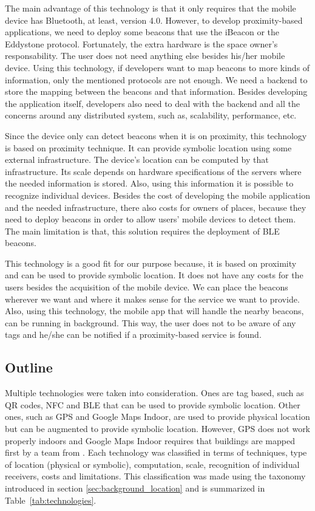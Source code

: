 The main advantage of this technology is that it only requires that the mobile device has Bluetooth, at least, version 4.0.
However, to develop proximity-based applications, we need to deploy some beacons that use the iBeacon or the Eddystone protocol.
Fortunately, the extra hardware is the space owner's responsability.
The user does not need anything else besides his/her mobile device.
Using this technology, if developers want to map beacons to more kinds of information, only the mentioned protocols are not enough.
We need a backend to store the mapping between the beacons and that information.
Besides developing the application itself, developers also need to deal with the backend and all the concerns around any distributed system, such as, scalability, performance, etc.

Since the device only can detect beacons when it is on proximity, this technology is based on proximity technique.
It can provide symbolic location using some external infrastructure.
The device's location can be computed by that infrastructure.
Its scale depends on hardware specifications of the servers where the needed information is stored.
Also, using this information it is possible to recognize individual devices.
Besides the cost of developing the mobile application and the needed infrastructure, there also costs for owners of places, because they need to deploy beacons in order to allow users' mobile devices to detect them.
The main limitation is that, this solution requires the deployment of \gls{BLE} beacons.

This technology is a good fit for our purpose because, it is based on proximity and can be used to provide symbolic location.
It does not have any costs for the users besides the acquisition of the mobile device.
We can place the beacons wherever we want and where it makes sense for the service we want to provide.
Also, using this technology, the mobile app that will handle the nearby beacons, can be running in background.
This way, the user does not to be aware of any tags and he/she can be notified if a proximity-based service is found.

\subsection{Outline}
\label{sub:background_outline}
Multiple technologies were taken into consideration.
Ones are tag based, such as \gls{QR} codes, \gls{NFC} and \gls{BLE} that can be used to provide symbolic location.
Other ones, such as \gls{GPS} and Google Maps Indoor, are used to provide physical location but can be augmented to provide symbolic location.
However, \gls{GPS} does not work properly indoors and Google Maps Indoor requires that buildings are mapped first by a team from .
Each technology was classified in terms of techniques, type of location (physical or symbolic), computation, scale, recognition of individual receivers, costs and limitations.
This classification was made using the taxonomy introduced in section \ref{sec:background_location} and is summarized in Table~\ref{tab:technologies}.

